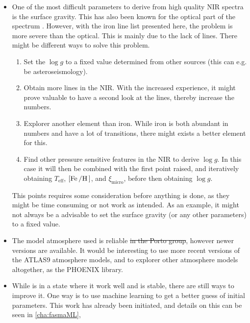 \begin{itemize}
  \item One of the most difficult parameters to derive from high quality NIR spectra is the surface
        gravity. This has also been known for the optical part of the spectrum
        \citep[see e.g.][]{Mortier2014}. However, with the iron line list presented here, the
        problem is more severe than the optical. This is mainly due to the lack of 
        lines. There might be different ways to solve this problem.
        \begin{enumerate}
          \item Set the $\log g$ to a fixed value determined from other sources (this can e.g. be
                asteroseismology).
          \item Obtain more  lines in the NIR. With the increased experience, it might
                prove valuable to have a second look at the  lines, thereby increase the
                numbers.
          \item Explorer another element than iron. While iron is both abundant in numbers and have
                a lot of transitions, there might exists a better element for this.
          \item Find other pressure sensitive features in the NIR to derive $\log g$. In this case
                it will then be combined with the first point raised, and iteratively obtaining
                $T_\mathrm{eff}$, $[\ion{Fe}/\ion{H}]$, and $\xi_\mathrm{micro}$, before then
                obtaining $\log g$.
        \end{enumerate}
        This points requires some consideration before anything is done, as they might be time
        consuming or not work as intended. As an example, it might not always be a advisable to
        set the surface gravity (or any other parameters) to a fixed value.
  \item The model atmosphere used is reliable \st{in the Porto group}, however newer versions are
        available. It would be interesting to use more recent versions of the ATLAS9 atmosphere
        models, and to explorer other atmosphere models altogether, as the PHOENIX library.
  \item While  is in a state where it work well and is stable, there are still ways to
        improve it. One way is to use machine learning to get a better guess of initial parameters.
        This work has already been initiated, and details on this can be seen in \cref{cha:fasmaML},

\end{itemize}
